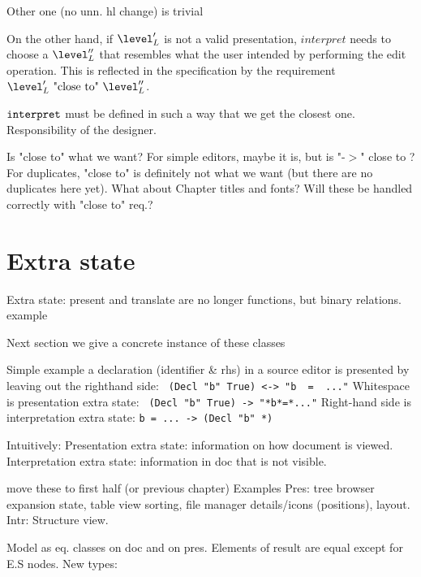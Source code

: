 Other one (no unn. hl change) is trivial

On the other hand, if $\level'_{L}$ is not a valid presentation, $interpret$ needs to choose a  $\level''_{L}$ that resembles what the user intended by performing the edit operation. This is reflected in the specification by the requirement $\level'_{L}~\text{"close to"}~\level''_{L}$.

\bl
\* ${\tt interpret}$ must be defined in such a way that we get the closest one.
\* Responsibility of the designer.
\el

\bl
\* Is "close to" what we want? For simple editors, maybe it is, but is "-$>$" close to \rarr? For duplicates, "close to" is definitely not what we want (but there are no duplicates here yet).
\* What about Chapter titles and fonts? Will these be handled correctly with "close to" req.?
\el


%																
%																
%																
\section{Extra state}


Extra state: present and translate are no longer functions, but binary relations. example

Next section we give a concrete instance of these classes

\bl
\* Simple example a declaration (identifier \& rhs) in a source editor is presented by leaving out the righthand side:
\* \verb| (Decl "b" True) <-> "b  =  ..."|
\* Whitespace is presentation extra state: \verb| (Decl "b" True) -> "*b*=*..."|
\* Right-hand side is interpretation extra state: \verb|b = ... -> (Decl "b" *)|
\el

\bl
\* Intuitively: Presentation extra state: information on how document is viewed. 
\* Interpretation extra state: information in doc that is not visible. 
\el

\bl
\* move these to first half (or previous chapter)
\* Examples Pres: tree browser expansion state, table view sorting, file manager details/icons (positions), layout.
\* Intr: Structure view.
\el

\bl
\* Model as eq. classes on doc and on pres.
\* Elements of result are equal except for E.S nodes.
\* New types:
\el


